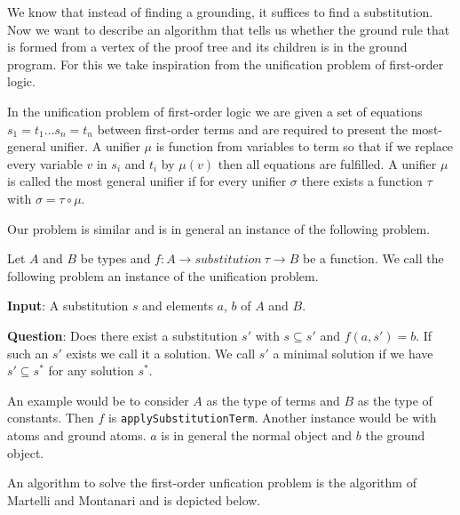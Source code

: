 We know that instead of finding a grounding, it suffices to find a substitution. Now we want to describe an algorithm that tells us whether the ground rule that is formed from a vertex of the proof tree and its children is in the ground program. For this we take inspiration from the unification problem of first-order logic.

In the unification problem of first-order logic we are given a set of equations $s_1 = t_1 \dots s_n = t_n$ between first-order terms and are required to present the most-general unifier. A unifier $\mu$ is function from variables to term so that if we replace every variable $v$ in $s_i$ and $t_i$ by $\mu (v)$ then all equations are fulfilled. A unifier $\mu$ is called the most general unifier if for every unifier $\sigma$ there exists a function $\tau$ with $\sigma = \tau \circ \mu$.

Our problem is similar and is in general an instance of the following problem.

\begin{definition}
    Let $A$ and $B$ be types and $f: A \to substitution\ \tau \to B$ be a function. We call the following problem an instance of the unification problem.

    \textbf{Input}: A substitution $s$ and elements $a$, $b$ of $A$ and $B$.

    \textbf{Question}: Does there exist a substitution $s'$ with $s \subseteq s'$ and $f(a, s') = b$. If such an $s'$ exists we call it a solution. We call $s'$ a minimal solution if we have $s' \subseteq s^\ast$ for any solution $s^\ast$.
\end{definition}

An example would be to consider $A$ as the type of terms and $B$ as the type of constants. Then $f$ is \lstinline|applySubstitutionTerm|. Another instance would be with atoms and ground atoms. $a$ is in general the normal object and $b$ the ground object.

An algorithm to solve the first-order unfication problem is the algorithm of Martelli and Montanari \cite{MartMont} and is depicted below.


